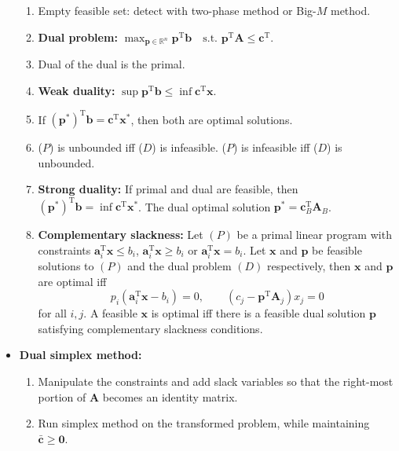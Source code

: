 \documentclass[10pt]{article}
\begin{document}
\begin{multicols*}{3}
\begin{itemize}
\begin{enumerate}
                \item Empty feasible set: detect with two-phase method or Big-$M$ method.
                \item \textbf{Dual problem:} $\max_{\bm{p} \in \mathbb{R}^n} \bm{p}^{\mathrm{T}}\bm{b} \quad \textrm{s.t. } \bm{p}^{\mathrm{T}}\bm{A} \leq \bm{c}^{\mathrm{T}}$.
                \item Dual of the dual is the primal.
                \item \textbf{Weak duality:} $\sup \bm{p}^{\mathrm{T}}\bm{b} \leq \inf \bm{c}^{\mathrm{T}}\bm{x}$.
                \item If $(\bm{p}^*)^{\mathrm{T}}\bm{b} = \bm{c}^{\mathrm{T}}\bm{x}^*$, then both are optimal solutions.
                \item ($P$) is unbounded iff ($D$) is infeasible. ($P$) is infeasible iff ($D$) is unbounded.
                \item \textbf{Strong duality:} If primal and dual are feasible, then $(\bm{p}^*)^{\mathrm{T}}\bm{b} = \inf \bm{c}^{\mathrm{T}}\bm{x}^*$. The dual optimal solution $\bm{p}^* = \bm{c}^{\mathrm{T}}_B\bm{A}_B$.
                \item \textbf{Complementary slackness:} Let $(P)$ be a primal linear program with constraints $\bm{a}_i^{\mathrm{T}}\bm{x} \leq b_i$, $\bm{a}_i^{\mathrm{T}}\bm{x} \geq b_i$ or $\bm{a}_i^{\mathrm{T}}\bm{x} = b_i$. Let $\bm{x}$ and $\bm{p}$ be feasible solutions to $(P)$ and the dual problem $(D)$ respectively, then $\bm{x}$ and $\bm{p}$ are optimal iff 
                \begin{equation*}
                    p_i\left(\bm{a}_i^{\mathrm{T}}\bm{x} - b_i\right) = 0, \qquad \left(c_j - \bm{p}^{\mathrm{T}}\bm{A}_j\right)x_j = 0
                \end{equation*}
                for all $i, j$. A feasible $\bm{x}$ is optimal iff there is a feasible dual solution $\bm{p}$ satisfying complementary slackness conditions.
            \end{enumerate} 
            \item \textbf{Dual simplex method:}
            \begin{enumerate}
                \item Manipulate the constraints and add slack variables so that the right-most portion of $\bm{A}$ becomes an identity matrix.
                \item Run simplex method on the transformed problem, while maintaining $\bar{\bm{c}} \geq \mathbf{0}$.
                \begin{enumerate}

\end{enumerate}
\end{enumerate}
\end{itemize}
\end{multicols*}
\end{document}
